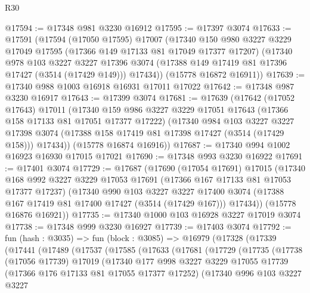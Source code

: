 \begin{lexlean}{R30}
\begin{coremodule}
@17594 := @17348 @981 @3230 @16912
@17595 := @17397 @3074
@17633 := @17591
    (@17594
      (@17050 @17595)
      @17007
      (@17340
        @150
        @980
        @3227
        @3229
        @17049
        @17595
        (@17366 @149 @17133 @81 @17049 @17377 @17207)
        (@17340
          @978
          @103
          @3227
          @3227
          @17396
          @3074
          (@17388 @149 @17419 @81 @17396 @17427 (@3514 (@17429 @149)))
          @17434))
      (@15778 @16872 @16911))
@17639 := @17340 @988 @1003 @16918 @16931 @17011 @17022
@17642 := @17348 @987 @3230 @16917
@17643 := @17399 @3074
@17681 := @17639
    (@17642
      (@17052 @17643)
      @17011
      (@17340
        @159
        @986
        @3227
        @3229
        @17051
        @17643
        (@17366 @158 @17133 @81 @17051 @17377 @17222)
        (@17340
          @984
          @103
          @3227
          @3227
          @17398
          @3074
          (@17388 @158 @17419 @81 @17398 @17427 (@3514 (@17429 @158)))
          @17434))
      (@15778 @16874 @16916))
@17687 := @17340 @994 @1002 @16923 @16930 @17015 @17021
@17690 := @17348 @993 @3230 @16922
@17691 := @17401 @3074
@17729 := @17687
    (@17690
      (@17054 @17691)
      @17015
      (@17340
        @168
        @992
        @3227
        @3229
        @17053
        @17691
        (@17366 @167 @17133 @81 @17053 @17377 @17237)
        (@17340
          @990
          @103
          @3227
          @3227
          @17400
          @3074
          (@17388 @167 @17419 @81 @17400 @17427 (@3514 (@17429 @167)))
          @17434))
      (@15778 @16876 @16921))
@17735 := @17340 @1000 @103 @16928 @3227 @17019 @3074
@17738 := @17348 @999 @3230 @16927
@17739 := @17403 @3074
@17792 := fun (hash : @3035) =>
  fun (block : @3085) =>
  @16979
    (@17328
      (@17339
        (@17441
          (@17489
            (@17537
              (@17585
                (@17633
                  (@17681
                    (@17729
                      (@17735
                        (@17738
                          (@17056 @17739)
                          @17019
                          (@17340
                            @177
                            @998
                            @3227
                            @3229
                            @17055
                            @17739
                            (@17366 @176 @17133 @81 @17055 @17377 @17252)
                            (@17340
                              @996
                              @103
                              @3227
                              @3227

\end{coremodule}
\end{lexlean}
